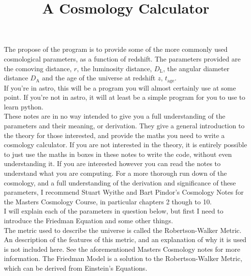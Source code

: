 \documentclass[]{article}
\begin{document}
\title{A Cosmology Calculator }
\maketitle

\noindent The propose of the program is to provide some of the more commonly used cosmological parameters, as a function of redshift. The parameters provided are the comoving distance, $r$, the luminosity distance, $D_\mathrm{L}$, the angular diameter distance $D_\mathrm{A}$ and the age of the universe at redshift $z$, $t_\mathrm{age}$. \\

\noindent If you're in astro, this will be a program you will almost certainly use at some point. If you're not in astro, it will at least be a simple program for you to use to learn python. \\

\noindent These notes are in no way intended to give you a full understanding of the parameters and their meaning, or derivation. They give a general introduction to the theory for those interested, and provide the maths you need to write a cosmology calculator. If you are not interested in the theory, it is entirely possible to just use the maths in boxes in these notes to write the code, without even understanding it. If you are interested however you can read the notes to understand what you are computing. For a more thorough run down of the cosmology, and a full understanding of the derivation and significance of these parameters, I recommend Stuart Wyithe and Bart Pindor’s Cosmology Notes for the Masters Cosmology Course, in particular chapters 2 though to 10. \\

\noindent I will explain each of the parameters in question below, but first I need to introduce the Friedman Equation and some other things.\\

\noindent The metric used to describe the universe is called the Robertson-Walker Metric. An description of the features of this metric, and an explanation of why it is used is not included here. See the aforementioned Masters Cosmology notes for more information. The Friedman Model is a solution to the Robertson-Walker Metric, which can be derived from Einstein’s Equations.\\
\end{document}
